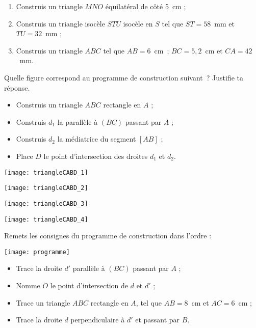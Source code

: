 \begin{exercice}
 \begin{enumerate}
  \item Construis un triangle $MNO$ équilatéral de côté 5 cm ;
  \item Construis un triangle isocèle $STU$ isocèle en $S$ tel que $ST = 58$ mm et $TU = 32$ mm ;
  \item Construis un triangle $ABC$ tel que $AB = 6$ cm ; $BC = 5,2$ cm et $CA = 42$ mm.
  \end{enumerate}
\end{exercice}


\begin{exercice}
Quelle figure correspond au programme de construction suivant ? Justifie ta réponse.
 \begin{itemize}
  \item Construis un triangle $ABC$ rectangle en $A$ ;
  \item Construis $d_1$ la parallèle à $(BC)$ passant par $A$ ;
  \item Construis $d_2$ la médiatrice du segment $[AB]$ ;
  \item Place $D$ le point d'intersection des droites $d_1$ et $d_2$.
  \end{itemize}
  \begin{colenumerate}{2}
   \item \texttt{[image: triangleCABD\_1]}
   \item \texttt{[image: triangleCABD\_2]}   
   \item \texttt{[image: triangleCABD\_3]}
   \item \texttt{[image: triangleCABD\_4]}
   \end{colenumerate}
\end{exercice}


\begin{exercice}
Remets les consignes du programme de construction dans l'ordre :
\begin{center} \texttt{[image: programme]} \end{center}
 \begin{itemize}
  \item Trace la droite $d'$ parallèle à $(BC)$ passant par $A$ ;
  \item Nomme $O$ le point d'intersection de $d$ et $d'$ ;
  \item Trace un triangle $ABC$ rectangle en $A$, tel que $AB = 8$ cm et $AC = 6$ cm ;
  \item Trace la droite $d$ perpendiculaire à $d'$ et passant par $B$.
  \end{itemize}
\end{exercice}


